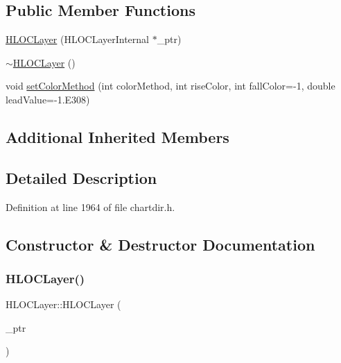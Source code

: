 \subsection*{Public Member Functions}
\begin{DoxyCompactItemize}
\item 
\hyperlink{class_h_l_o_c_layer_af344283b5b8523040dd503ec7d161a8d}{H\+L\+O\+C\+Layer} (H\+L\+O\+C\+Layer\+Internal $\ast$\+\_\+ptr)
\item 
\hyperlink{class_h_l_o_c_layer_a2e9bd4ccf461e881cc1b064153065c9f}{$\sim$\+H\+L\+O\+C\+Layer} ()
\item 
void \hyperlink{class_h_l_o_c_layer_aa7c17220be7b3289bce51d7b02fd6407}{set\+Color\+Method} (int color\+Method, int rise\+Color, int fall\+Color=-\/1, double lead\+Value=-\/1.\+E308)
\end{DoxyCompactItemize}
\subsection*{Additional Inherited Members}


\subsection{Detailed Description}


Definition at line 1964 of file chartdir.\+h.



\subsection{Constructor \& Destructor Documentation}
\mbox{\label{class_h_l_o_c_layer_af344283b5b8523040dd503ec7d161a8d}} 
\subsubsection{\texorpdfstring{H\+L\+O\+C\+Layer()}{HLOCLayer()}}
{\footnotesize\ttfamily H\+L\+O\+C\+Layer\+::\+H\+L\+O\+C\+Layer (\begin{DoxyParamCaption}\item[{H\+L\+O\+C\+Layer\+Internal $\ast$}]{\+\_\+ptr }\end{DoxyParamCaption})\hspace{0.3cm}{\ttfamily [inline]}}



